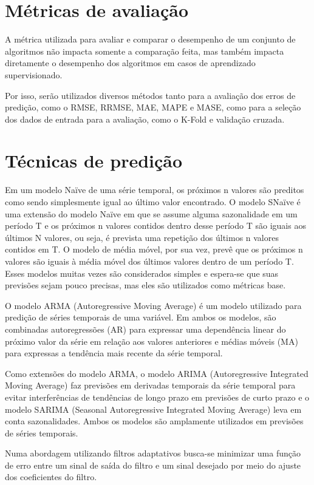 \section{Métricas de avaliação}
A métrica utilizada para avaliar e comparar o desempenho de um conjunto de algoritmos não impacta somente a comparação feita, mas também impacta diretamente o desempenho dos algoritmos em casos de aprendizado supervisionado.

Por isso, serão utilizados diversos métodos tanto para a avaliação dos erros de predição, como o RMSE, RRMSE, MAE, MAPE e MASE, como para a seleção dos dados de entrada para a avaliação, como o K-Fold e validação cruzada.

\section{Técnicas de predição}

Em um modelo Naïve de uma série temporal, os próximos n valores são preditos como sendo simplesmente igual ao último valor encontrado. O modelo SNaïve é uma extensão do modelo Naïve em que se assume alguma sazonalidade em um período T e os próximos n valores contidos dentro desse período T são iguais aos últimos N valores, ou seja, é prevista uma repetição dos últimos n valores contidos em T. O modelo de média móvel, por sua vez, prevê que os próximos n valores são iguais à média móvel dos últimos valores dentro de um período T. Esses modelos muitas vezes são considerados simples e espera-se que suas previsões sejam pouco precisas, mas eles são utilizados como métricas base.

O modelo ARMA (Autoregressive Moving Average) é um modelo utilizado para predição de séries temporais de uma variável. Em ambos os modelos, são combinadas autoregressões (AR) para expressar uma dependência linear do próximo valor da série em relação aos valores anteriores e médias móveis (MA) para expressas a tendência mais recente da série temporal.

Como extensões do modelo ARMA, o modelo ARIMA (Autoregressive Integrated Moving Average) faz previsões em derivadas temporais da série temporal para evitar interferências de tendências de longo prazo em previsões de curto prazo e o modelo SARIMA (Seasonal Autoregressive Integrated Moving Average) leva em conta sazonalidades. Ambos os modelos são amplamente utilizados em previsões de séries temporais.

Numa abordagem utilizando filtros adaptativos busca-se minimizar uma função de erro entre um sinal de saída do filtro e um sinal desejado por meio do ajuste dos coeficientes do filtro.

